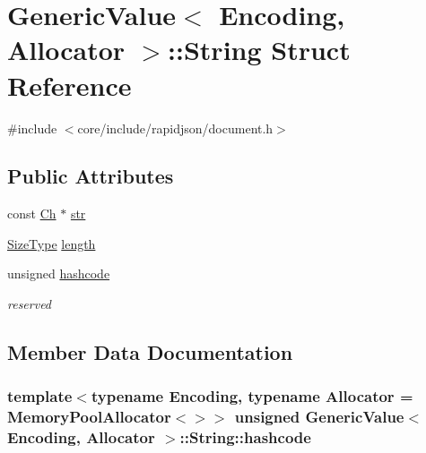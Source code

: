 \hypertarget{structGenericValue_1_1String}{}\section{Generic\+Value$<$ Encoding, Allocator $>$\+:\+:String Struct Reference}
\label{structGenericValue_1_1String}


{\ttfamily \#include $<$core/include/rapidjson/document.\+h$>$}

\subsection*{Public Attributes}
\begin{DoxyCompactItemize}
\item 
const \hyperlink{classGenericValue_ade0e0ce64ccd5d852da57a35e720bafb}{Ch} $\ast$ \hyperlink{structGenericValue_1_1String_a4eebc5acf3f93ab833efd82abf3ba84d}{str}
\item 
\hyperlink{rapidjson_8h_a5ed6e6e67250fadbd041127e6386dcb5}{Size\+Type} \hyperlink{structGenericValue_1_1String_ad6ffab0e093aa8db6e415812ff6443bf}{length}
\item 
unsigned \hyperlink{structGenericValue_1_1String_a3f1da673591f850e425184f2d8495d66}{hashcode}
\begin{DoxyCompactList}\small\item\em reserved \end{DoxyCompactList}\end{DoxyCompactItemize}


\subsection{Member Data Documentation}
\subsubsection[{\texorpdfstring{hashcode}{hashcode}}]{\setlength{\rightskip}{0pt plus 5cm}template$<$typename Encoding, typename Allocator = Memory\+Pool\+Allocator$<$$>$$>$ unsigned {\bf Generic\+Value}$<$ Encoding, Allocator $>$\+::String\+::hashcode}\hypertarget{structGenericValue_1_1String_a3f1da673591f850e425184f2d8495d66}{}\label{structGenericValue_1_1String_a3f1da673591f850e425184f2d8495d66}


